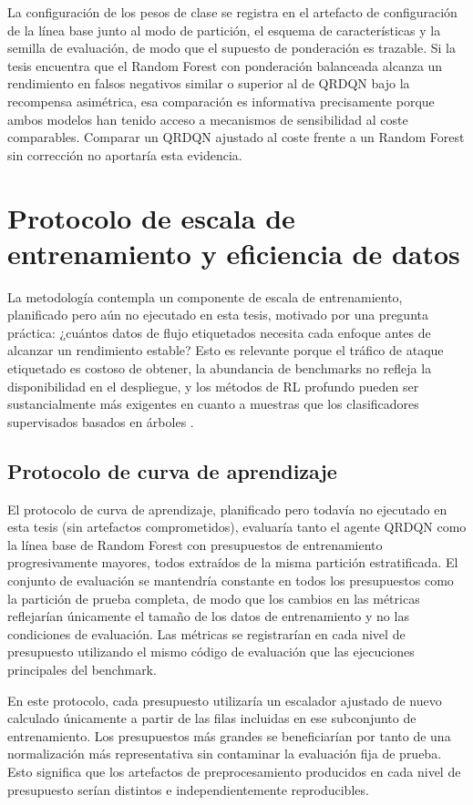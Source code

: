 La configuración de los pesos de clase se registra en el artefacto de configuración de la línea base junto al modo de partición, el esquema de características y la semilla de evaluación, de modo que el supuesto de ponderación es trazable. Si la tesis encuentra que el Random Forest con ponderación balanceada alcanza un rendimiento en falsos negativos similar o superior al de QRDQN bajo la recompensa asimétrica, esa comparación es informativa precisamente porque ambos modelos han tenido acceso a mecanismos de sensibilidad al coste comparables. Comparar un QRDQN ajustado al coste frente a un Random Forest sin corrección no aportaría esta evidencia.

\section{Protocolo de escala de entrenamiento y eficiencia de datos}
La metodología contempla un componente de escala de entrenamiento, planificado pero aún no ejecutado en esta tesis, motivado por una pregunta práctica: ¿cuántos datos de flujo etiquetados necesita cada enfoque antes de alcanzar un rendimiento estable? Esto es relevante porque el tráfico de ataque etiquetado es costoso de obtener, la abundancia de benchmarks no refleja la disponibilidad en el despliegue, y los métodos de RL profundo pueden ser sustancialmente más exigentes en cuanto a muestras que los clasificadores supervisados basados en árboles \parencite{SuttonBarto2018RL,Ring2019DatasetSurvey}.

\subsection{Protocolo de curva de aprendizaje}
El protocolo de curva de aprendizaje, planificado pero todavía no ejecutado en esta tesis (sin artefactos comprometidos), evaluaría tanto el agente QRDQN como la línea base de Random Forest con presupuestos de entrenamiento progresivamente mayores, todos extraídos de la misma partición estratificada. El conjunto de evaluación se mantendría constante en todos los presupuestos como la partición de prueba completa, de modo que los cambios en las métricas reflejarían únicamente el tamaño de los datos de entrenamiento y no las condiciones de evaluación. Las métricas se registrarían en cada nivel de presupuesto utilizando el mismo código de evaluación que las ejecuciones principales del benchmark.

En este protocolo, cada presupuesto utilizaría un escalador ajustado de nuevo calculado únicamente a partir de las filas incluidas en ese subconjunto de entrenamiento. Los presupuestos más grandes se beneficiarían por tanto de una normalización más representativa sin contaminar la evaluación fija de prueba. Esto significa que los artefactos de preprocesamiento producidos en cada nivel de presupuesto serían distintos e independientemente reproducibles.

